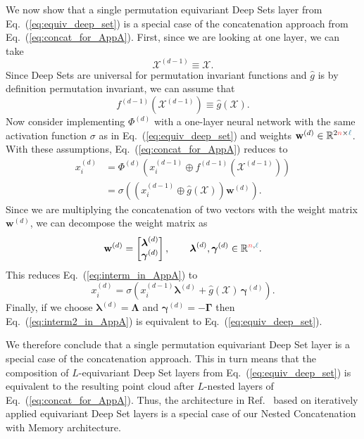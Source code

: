 \documentclass[aps,prd,twocolumn,superscriptaddress,floatfix,longbibliography,preprintnumbers,nofootinbib]{revtex4-1} %
\newcommand{\vect}[1]{\boldsymbol{\mathbf{#1}}}
\DeclareRobustCommand{\Eq}[1]{Eq.~(\ref{eq:#1})}
\newcommand{\reft}[1]{Ref.~\cite{#1}}
\begin{document}
We now show that a single permutation equivariant Deep Sets layer from \Eq{equiv_deep_set}  is a special case of the concatenation approach from \Eq{concat_for_AppA}.
%
First, since we are looking at one layer, we can take
%
\begin{equation}
\mathcal X^{(d-1)} \equiv \mathcal X.
\end{equation}
%
Since Deep Sets are universal for permutation invariant functions and $\hat{g}$ is by definition permutation invariant, we can assume that
%
\begin{equation}
f^{(d-1)}(\mathcal X^{(d-1)}) \equiv \hat{g}(\mathcal X).
\end{equation}
%
Now consider implementing $\Phi^{(d)}$ with a one-layer neural network with the same activation function $\sigma$ as in \Eq{equiv_deep_set} and weights \(\vect w^{(d)}\in\mathbb R^{2{\color{c1}n}\times {\color{c3}\ell}}\).
%
With these assumptions, \Eq{concat_for_AppA} reduces to 
\begin{align}
  \nonumber
  x_i^{(d)} &= \Phi^{(d)}\left( x_i^{(d-1)}\oplus f^{(d-1)} \left( \mathcal X^{(d-1)} \right)  \right) \\
            &= \sigma \left( \left( x_i^{(d-1)}\oplus \hat{g}(\mathcal X)  \right) \vect w^{(d)} \right) 
            \label{eq:interm_in_AppA}.
\end{align}
%
Since we are multiplying the concatenation of two vectors with the weight matrix $\vect w^{(d)}$, we can decompose the weight matrix as
%
\begin{equation}
  \vect w^{(d)} = \begin{bmatrix} \vect \lambda^{(d)}\\\vect\gamma^{(d)} \end{bmatrix}, \qquad \vect\lambda^{(d)},\vect\gamma^{(d)} \in \mathbb R^{{\color{c1}n},{\color{c3}\ell}}.
\end{equation}
%
This reduces \Eq{interm_in_AppA} to 
%
\begin{equation}
  x_i^{(d)} = \sigma \left( x_i^{(d-1)}\vect\lambda^{(d)} + \hat{g}(\mathcal X) \, \vect \gamma^{(d)} \right).
  \label{eq:interm2_in_AppA}
\end{equation}
%
Finally, if we choose \(\vect\lambda^{(d)} = \vect\Lambda\)  and \(\vect \gamma^{(d)} = -\vect\Gamma\) then \Eq{interm2_in_AppA} is equivalent to \Eq{equiv_deep_set}.



We therefore conclude that a single permutation equivariant Deep Set layer is a special case of the concatenation approach.
%
This in turn means that the composition of $L$-equivariant Deep Set layers from \Eq{equiv_deep_set} is equivalent to the resulting point cloud after $L$-nested layers of \Eq{concat_for_AppA}.
%
Thus, the architecture in \reft{Zaheer2017} based on iteratively applied equivariant Deep Set layers is a special case of our Nested Concatenation with Memory architecture.
\end{document}

